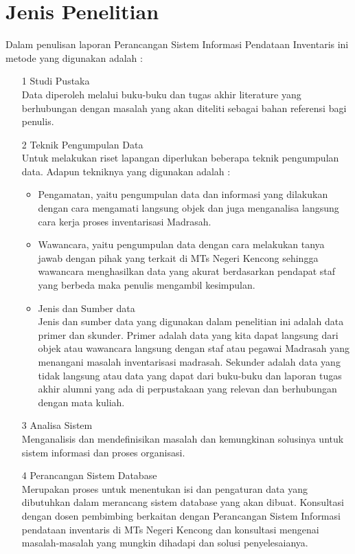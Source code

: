 \documentclass{jtetiproposalskripsi}
\begin{document}
\section{Jenis Penelitian}
Dalam penulisan laporan Perancangan Sistem Informasi Pendataan Inventaris ini metode yang digunakan adalah :
\begin{itemize}
\item[1]Studi Pustaka
\\
Data  diperoleh  melalui  buku-buku  dan  tugas  akhir  literature  yang  berhubungan dengan masalah yang akan diteliti sebagai bahan referensi bagi penulis.
\item[2]Teknik Pengumpulan Data
\\
Untuk melakukan riset lapangan diperlukan beberapa teknik pengumpulan   data. Adapun tekniknya yang digunakan adalah :
\begin{itemize}
\item Pengamatan, yaitu pengumpulan data dan informasi yang dilakukan     dengan cara mengamati   langsung   objek   dan   juga   menganalisa   langsung   cara   kerja   proses inventarisasi Madrasah.
\item Wawancara, yaitu pengumpulan data dengan cara melakukan tanya jawab dengan pihak yang terkait di MTs Negeri Kencong sehingga wawancara menghasilkan data yang akurat berdasarkan pendapat staf yang berbeda maka penulis mengambil kesimpulan.
\item Jenis dan Sumber data
\\
Jenis dan sumber data yang digunakan dalam penelitian ini adalah data primer dan skunder. Primer adalah data yang kita dapat langsung dari objek atau  wawancara langsung dengan staf atau pegawai Madrasah yang menangani masalah inventarisasi madrasah. Sekunder adalah data yang tidak langsung atau data yang dapat dari buku-buku dan laporan tugas akhir alumni yang ada di perpustakaan yang relevan dan berhubungan dengan mata kuliah.
\end{itemize}
\item[3]Analisa Sistem
\\
Menganalisis dan mendefinisikan masalah dan kemungkinan solusinya  untuk sistem informasi dan proses organisasi.
\item[4]Perancangan Sistem Database
\\
Merupakan proses untuk menentukan isi dan pengaturan data yang dibutuhkan dalam merancang sistem database yang akan dibuat. Konsultasi dengan dosen pembimbing berkaitan dengan Perancangan  Sistem Informasi pendataan inventaris di MTs Negeri Kencong dan konsultasi mengenai masalah-masalah yang mungkin dihadapi dan solusi penyelesaianya.

\end{itemize}
\end{document}
